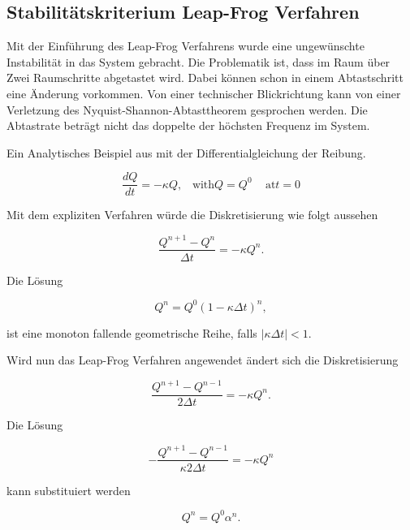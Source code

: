 \subsection{Stabilit\"atskriterium Leap-Frog Verfahren}
	Mit der Einf\"uhrung des Leap-Frog Verfahrens wurde eine ungew\"unschte Instabilit\"at in das System gebracht.
	Die Problematik ist, dass im Raum über Zwei Raumschritte abgetastet wird.
	Dabei können schon in einem Abtastschritt eine Änderung vorkommen.
	Von einer technischer Blickrichtung kann von einer Verletzung des Nyquist-Shannon-Abtasttheorem gesprochen werden.
	Die Abtastrate beträgt nicht das doppelte der höchsten Frequenz im System.

	
	Ein Analytisches Beispiel aus \cite{burgers:lynch_2014} mit der Differentialgleichung der Reibung.
	
	\begin{equation}
		\frac{dQ}{dt} = - \kappa Q, \,\,\,\,\, \text{with} Q=Q^0 \,\,\,\,\,\,\, \text{at} t=0
	\end{equation}

	Mit dem expliziten Verfahren w\"urde die Diskretisierung wie folgt aussehen
	
	\begin{equation}
		\frac{Q^{n+1}-Q^n}{\Delta t} = - \kappa Q^n.
	\end{equation}

	Die L\"osung
	
		\begin{equation}
			Q^n = Q^0(1-\kappa \Delta t)^n,
		\end{equation}
		
	ist eine monoton fallende geometrische Reihe, falls $|\kappa \Delta t| <1$.
	
	\medskip
	
	Wird nun das Leap-Frog Verfahren angewendet \"andert sich die Diskretisierung
	
	\begin{equation}
		\frac{Q^{n+1}-Q^{n-1}}{2 \Delta t} = - \kappa Q^n.
	\end{equation}

	Die L\"osung 
	
	\begin{equation}
		-\frac{Q^{n+1}-Q^{n-1}}{\kappa 2 \Delta t} = - \kappa Q^n
	\end{equation}

	kann substituiert werden
	
		\begin{equation}
			Q^n = Q^0\alpha ^n.
			\label{burgers:eq_cm}
		\end{equation}
	
